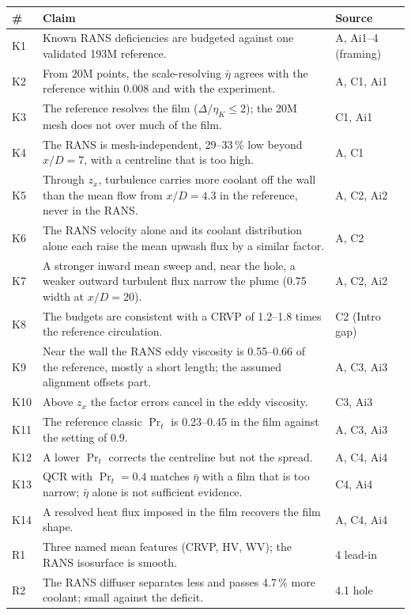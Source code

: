 \documentclass[10pt]{article}
\begin{document}
{\footnotesize
\begin{longtable}{@{}L{0.7cm} L{12.6cm} L{3.4cm}@{}}
\toprule
\# & Claim & Source \\
\midrule
\endhead
K1 & Known RANS deficiencies are budgeted against one validated 193M reference. & A, Ai1--4 (framing) \\
K2 & From 20M points, the scale-resolving $\bar\eta$ agrees with the reference within 0.008 and with the experiment. & A, C1, Ai1 \\
K3 & The reference resolves the film ($\Delta/\eta_K\le2$); the 20M mesh does not over much of the film. & C1, Ai1 \\
K4 & The RANS is mesh-independent, 29--33\,\% low beyond $x/D=7$, with a centreline that is too high. & A, C1 \\
K5 & Through $z_x$, turbulence carries more coolant off the wall than the mean flow from $x/D=4.3$ in the reference, never in the RANS. & A, C2, Ai2 \\
K6 & The RANS velocity alone and its coolant distribution alone each raise the mean upwash flux by a similar factor. & A, C2 \\
K7 & A stronger inward mean sweep and, near the hole, a weaker outward turbulent flux narrow the plume (0.75 width at $x/D=20$). & A, C2, Ai2 \\
K8 & The budgets are consistent with a CRVP of 1.2--1.8 times the reference circulation. & C2 (Intro gap) \\
K9 & Near the wall the RANS eddy viscosity is 0.55--0.66 of the reference, mostly a short length; the assumed alignment offsets part. & A, C3, Ai3 \\
K10 & Above $z_x$ the factor errors cancel in the eddy viscosity. & C3, Ai3 \\
K11 & The reference classic $\Pr_t$ is 0.23--0.45 in the film against the setting of 0.9. & A, C3, Ai3 \\
K12 & A lower $\Pr_t$ corrects the centreline but not the spread. & A, C4, Ai4 \\
K13 & QCR with $\Pr_t=0.4$ matches $\bar\eta$ with a film that is too narrow; $\bar\eta$ alone is not sufficient evidence. & C4, Ai4 \\
K14 & A resolved heat flux imposed in the film recovers the film shape. & A, C4, Ai4 \\
\midrule
R1 & Three named mean features (CRVP, HV, WV); the RANS isosurface is smooth. & 4 lead-in \\
R2 & The RANS diffuser separates less and passes 4.7\,\% more coolant; small against the deficit. & 4.1 hole \\

\end{longtable}}
\end{document}
